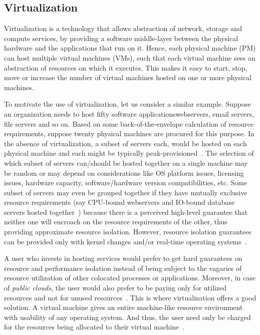 \subsection{Virtualization}
Virtualization is a technology that allows abstraction of network, storage
and compute services, by providing a software middle-layer between the
physical hardware and the applications that run on it.
Hence, each physical machine (PM) 
can host multiple virtual machines (VMs),
such that each virtual machine sees an
abstraction of resources on which it executes. This makes it easy
to start, stop, move or increase the number of virtual machines hosted
on one or more physical machines.

To motivate the use of virtualization, let us consider a similar example.
Suppose an organization needs to host fifty software 
applications\textemdash{}webservers, email servers, file servers and so on.
Based on some back-of-the-envelope calculation of resource requirements,
suppose twenty physical machines are procured for this purpose.
In the absence of virtualization, a subset of servers each, would be hosted
on each physical machine and each might be typically
peak-provisioned~\cite{berkeley-view}. 
The selection of which subset of servers can/should
be hosted together on a single machine may be random or may depend on
considerations like
OS platform issues, licensing issues, hardware capacity, software/hardware
version compatibilities, etc. Some subset of servers may even be grouped
together if they have mutually exclusive resource requirements (say
CPU-bound webservers and 
IO-bound database servers 
hosted together~\cite{dynamic-provisioning-multi-tier}) 
because there is a perceived high-level guarantee that neither 
one will encroach on the resource
requirements of the other, 
thus providing approximate resource isolation.
However, resource isolation guarantees can be provided only with kernel 
changes and/or real-time operating systems~\cite{enforcing-isolation}.

A user who invests in hosting services would prefer to get hard guarantees
on resource and performance isolation instead of being subject
to the vagaries of resource utilization of other colocated processes
or applications. 
Moreover, in case of \textit{public clouds}, 
the user would also prefer to be paying only for
utilized resources and not for unused resources~\cite{berkeley-view}. This is
where virtualization offers a good solution. A virtual machine gives
an entire machine-like resource environment with usability of any
operating system. And thus, the user need only be charged for the resources
being allocated to their virtual machine~\cite{ec2}.

